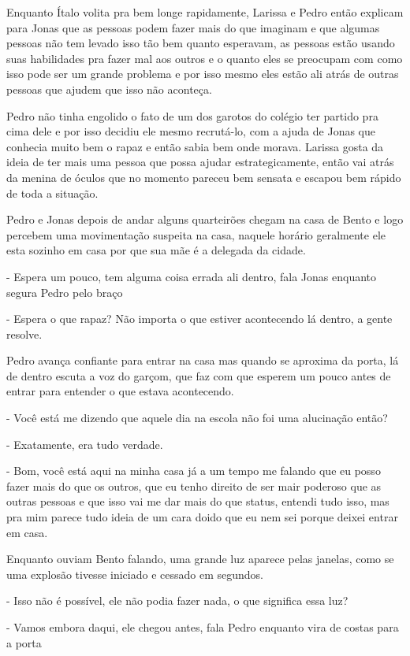 Enquanto Ítalo volita pra bem longe rapidamente, Larissa e Pedro então explicam para Jonas que as pessoas podem fazer mais do que imaginam e que algumas pessoas não tem levado isso tão bem quanto esperavam, as pessoas estão usando suas habilidades pra fazer mal aos outros e o quanto eles se preocupam com como isso pode ser um grande problema e por isso mesmo eles estão ali atrás de outras pessoas que ajudem que isso não aconteça.

Pedro não tinha engolido o fato de um dos garotos do colégio ter partido pra cima dele e por isso decidiu ele mesmo recrutá-lo, com a ajuda de Jonas que conhecia muito bem o rapaz e então sabia bem onde morava. Larissa gosta da ideia de ter mais uma pessoa que possa ajudar estrategicamente, então vai atrás da menina de óculos que no momento pareceu bem sensata e escapou bem rápido de toda a situação.

Pedro e Jonas depois de andar alguns quarteirões chegam na casa de Bento e logo percebem uma movimentação suspeita na casa, naquele horário geralmente ele esta sozinho em casa por que sua mãe é a delegada da cidade.

- Espera um pouco, tem alguma coisa errada ali dentro, fala Jonas enquanto segura Pedro pelo braço

- Espera o que rapaz? Não importa o que estiver acontecendo lá dentro, a gente resolve.


Pedro avança confiante para entrar na casa mas quando se aproxima da porta, lá de dentro escuta a voz do garçom, que faz com que esperem um pouco antes de entrar para entender o que estava acontecendo.

- Você está me dizendo que aquele dia na escola não foi uma alucinação então?

- Exatamente, era tudo verdade.

- Bom, você está aqui na minha casa já a um tempo me falando que eu posso fazer mais do que os outros, que eu tenho direito de ser mair poderoso que as outras pessoas e que isso vai me dar mais do que status, entendi tudo isso, mas pra mim parece tudo ideia de um cara doido que eu nem sei porque deixei entrar em casa.


Enquanto ouviam Bento falando, uma grande luz aparece pelas janelas, como se uma explosão tivesse iniciado e cessado em segundos.

- Isso não é possível, ele não podia fazer nada, o que significa essa luz?

- Vamos embora daqui, ele chegou antes, fala Pedro enquanto vira de costas para a porta

